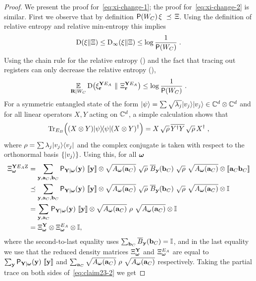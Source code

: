 \begin{proof}
We present the proof for~\eqref{eq:xi-change-1}; the proof for~\eqref{eq:xi-change-2} is similar. 
First we observe that by definition $\P(W_C) \, \xi\,\, \preceq \,\Xi$. Using the definition of relative entropy and relative min-entropy this implies
\[ \D(\xi \| \Xi)\leq \D_\infty(\xi \| \Xi) \leq \log \frac{1}{\P(W_C)}\;.\]
  Using the chain rule for the relative entropy () and the fact that tracing out registers can only decrease the relative entropy (), 
\begin{equation}\label{eq:claim23-1}
	\Ex_{\bR | W_C} \D \big (\xi_{\br}^{\bY E_A} \,\, \| \,\, \Xi_{\br}^{\bY E_A} \big ) \leq \log \frac{1}{\P(W_C)}\;.
\end{equation}
For a symmetric entangled state of the form $\ket{\psi} = \sum \sqrt{\lambda_j} \ket{v_j}\ket{v_j} \in \C^d \otimes \C^d$ and for all linear operators $X,Y$ acting on $\C^d$, a simple calculation shows that
\[
	\Tr_{E_B} \Big( (X \otimes Y)\ketbra{\psi}{\psi}(X \otimes Y)^\dagger \Big) = X \, \sqrt{\rho} \, \overline{Y^\dagger Y} \, \sqrt{\rho} \, X^\dagger\;,
\]
where $\rho = \sum \lambda_j \ket{v_j}\bra{v_j}$ and the complex conjugate is taken with respect to the orthonormal basis $\{\ket{v_j}\}$.  
	Using this, for all $\bomega$ 
	\begin{align}
		\Xi_\bomega^{\bY E_A \ac} &= \sum_{\by, \ba_C, \bb_C} \P_{\bY | \bomega}(\by) \,\, \puretomixed{\by} \otimes \sqrt{A_\bomega(\ba_C)} \,\, \sqrt{\rho} \,\, \overline{B}_{\by}(\bb_C) \,\, \sqrt{\rho} \,\, \sqrt{A_\bomega(\ba_C)}  \otimes \puretomixed{\ba_C \bb_C}\notag \\
		&\preceq  \sum_{\by, \ba_C, \bb_C} \P_{\bY | \bomega}(\by) \,\, \puretomixed{\by} \otimes \sqrt{A_\bomega(\ba_C)} \,\, \sqrt{\rho} \,\, \overline{B}_{\by}(\bb_C) \,\, \sqrt{\rho} \,\, \sqrt{A_\bomega(\ba_C)} \otimes \Id \notag\\
		&= \sum_{\by, \ba_C} \P_{\bY | \bomega}(\by) \,\, \puretomixed{\by} \otimes \sqrt{A_\bomega(\ba_C)} \,\,\rho\,\, \sqrt{A_\bomega(\ba_C)} \otimes \Id \notag \\
		&= \Xi_\bomega^{\bY} \otimes \Xi_\bomega^{E_A} \otimes \Id \label{eq:claim23-2},
	\end{align}
where the second-to-last equality uses $\sum_{\bb_C} \overline{B}_{\by}(\bb_C) = \Id$,  and in the last equality we use that the reduced density matrices $\Xi_\bomega^{\bY}$ and $\Xi_\bomega^{E_A}$ are equal to $\sum_{\by} \P_{\bY | \bomega}(\by) \,\, \puretomixed{\by}$ and $\sum_{\ba_C} \sqrt{A_\bomega(\ba_C)} \,\,\rho\,\, \sqrt{A_\bomega(\ba_C)}$ respectively. Taking the partial trace on both sides of~\eqref{eq:claim23-2} we get

\end{proof}
